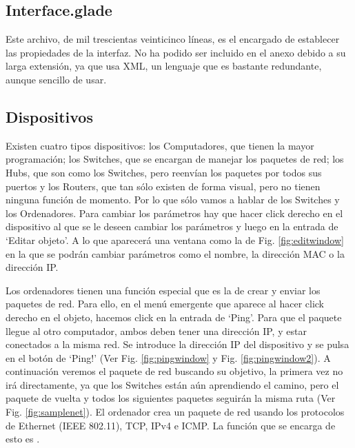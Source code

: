 \documentclass[a4paper, 11pt]{report} %
\begin{document}
\subsection{Interface.glade}
Este archivo, de mil trescientas veinticinco líneas, es el encargado de establecer las propiedades de la interfaz. No ha podido ser incluido en el anexo debido a su larga extensión, ya que usa XML, un lenguaje que es bastante redundante, aunque sencillo de usar.

\subsection{Dispositivos}
Existen cuatro tipos dispositivos: los Computadores, que tienen la mayor programación; los Switches, que se encargan de manejar los paquetes de red; los Hubs, que son como los Switches, pero reenvían los paquetes por todos sus puertos y los Routers, que tan sólo existen de forma visual, pero no tienen ninguna función de momento. Por lo que sólo vamos a hablar de los Switches y los Ordenadores. Para cambiar los parámetros hay que hacer click derecho en el dispositivo al que se le deseen cambiar los parámetros y luego en la entrada de `Editar objeto'. A lo que aparecerá una ventana como la de Fig. \ref{fig:editwindow} en la que se podrán cambiar parámetros como el nombre, la dirección MAC o la dirección IP.

Los ordenadores tienen una función especial que es la de crear y enviar los paquetes de red. Para ello, en el menú emergente que aparece al hacer click derecho en el objeto, hacemos click en la entrada de `Ping'. Para que el paquete llegue al otro computador, ambos deben tener una dirección IP, y estar conectados a la misma red. Se introduce la dirección IP del dispositivo y se pulsa en el botón de `Ping!' (Ver Fig. \ref{fig:pingwindow} y Fig. \ref{fig:pingwindow2}). A continuación veremos el paquete de red buscando su objetivo, la primera vez no irá directamente, ya que los Switches están aún aprendiendo el camino, pero el paquete de vuelta y todos los siguientes paquetes seguirán la misma ruta (Ver Fig. \ref{fig:samplenet}). El ordenador crea un paquete de red usando los protocolos de Ethernet (IEEE 802.11), TCP, IPv4 e ICMP. La función que se encarga de esto es .
\end{document}
